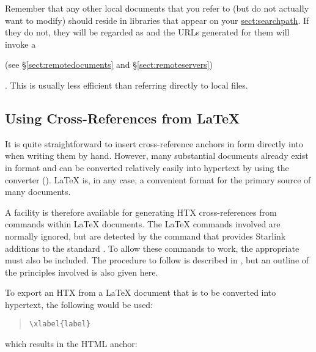 Remember that any other local documents that you refer to (but do not
actually want to modify) should reside in libraries that appear on
your \hyperref{\hi{HTX\_PATH} search path}{\hi{HTX\_PATH} search path (see
\S}{)}{sect:searchpath}. If they do not, they will be regarded as
 and the URLs generated for them will invoke
a \begin{latexonly}
(see \S\ref{sect:remotedocuments} and \S\ref{sect:remoteservers})
\end{latexonly}.
This is usually less efficient than referring directly to local files.

\subsection{\label{sect:convertingfromlatex}Using Cross-References from \LaTeX}

It is quite straightforward to insert  cross-reference
anchors in  form directly into  when
writing them by hand. However, many substantial documents already
exist in \latexref{\LaTeX} format and can be converted relatively
easily into hypertext by using the
\htmladdnormallinkfoot{\latextohtml}{\latextohtmlurl} converter
(). \LaTeX{} is, in any case, a convenient
format for the primary source of many documents.

A facility is therefore available for generating HTX cross-references
from commands within \LaTeX{} documents.  The \LaTeX{} commands
involved are normally ignored, but are detected by the
 command that provides
Starlink additions to the standard \latextohtml. To allow these
commands to work, the appropriate  must also be included. The procedure to
follow is described in , but an outline of the
principles involved is also given here.

To export an HTX  from a \LaTeX{}
document that is to be converted into hypertext, the following would
be used:

\begin{quote}
\begin{verbatim}
\xlabel{label}
\end{verbatim}
\end{quote}

which results in the HTML anchor:

